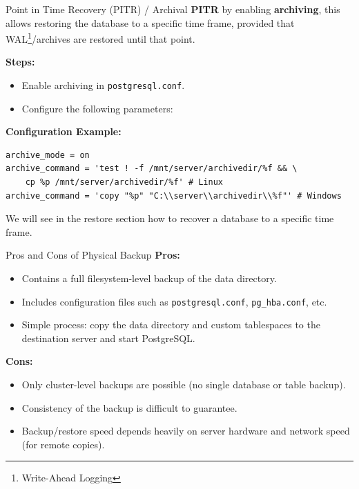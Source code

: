 \documentclass[aspectratio=169]{beamer}
\newcommand{\toRight}[1]{
    \begin{FlushRight}
        {\tiny #1}
    \end{FlushRight}
} %
\begin{document}
\begin{frame}[fragile]{Point in Time Recovery (PITR) / Archival}
    \textbf{PITR} by enabling \textbf{archiving}, this allows restoring the database to a specific time frame, provided that WAL\footnote{Write-Ahead Logging}/archives are restored until that point.

    \vspace{0.3cm}
    \textbf{Steps:}
    \begin{itemize}
        \item Enable archiving in \texttt{postgresql.conf}.
        \item Configure the following parameters:
    \end{itemize}

    \vspace{0.3cm}
    \textbf{Configuration Example:}
    \begin{verbatim}
archive_mode = on
archive_command = 'test ! -f /mnt/server/archivedir/%f && \
    cp %p /mnt/server/archivedir/%f' # Linux
archive_command = 'copy "%p" "C:\\server\\archivedir\\%f"' # Windows
    \end{verbatim}
    \vspace{-5mm}
    \toRight{\tiny We will see in the restore section how to recover a database to a specific time frame.}
\end{frame}

\begin{frame}{Pros and Cons of Physical Backup}
    \textbf{Pros:}
    \begin{itemize}
        \item Contains a full filesystem-level backup of the data directory.
        \item Includes configuration files such as \texttt{postgresql.conf}, \texttt{pg\_hba.conf}, etc.
        \item Simple process: copy the data directory and custom tablespaces to the destination server and start PostgreSQL.
    \end{itemize}

    \vspace{0.3cm}
    \textbf{Cons:}
    \begin{itemize}
        \item Only cluster-level backups are possible (no single database or table backup).
        \item Consistency of the backup is difficult to guarantee.
        \item Backup/restore speed depends heavily on server hardware and network speed (for remote copies).
    \end{itemize}
\end{frame}
\end{document}
